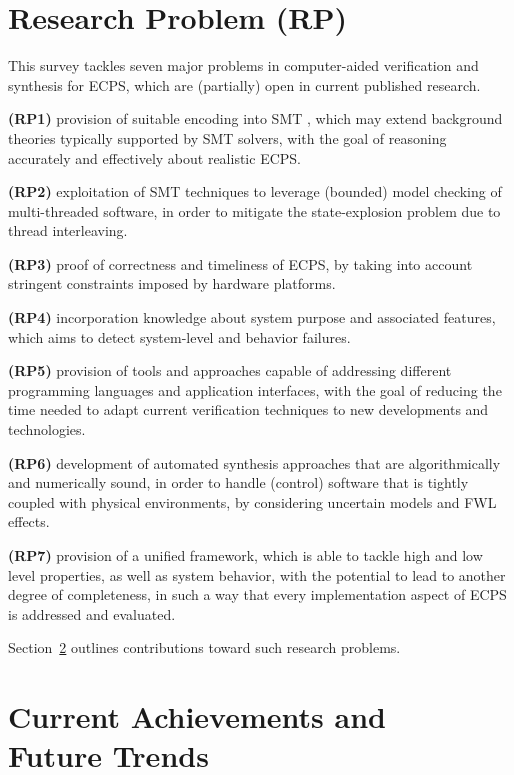 \documentclass[format=acmsmall, review=false, screen=true]{acmart}
\begin{document}
\section{Research Problem (RP)}
\label{Research-Problem}

This survey tackles seven major problems in computer-aided verification and synthesis for ECPS, which are (partially) open in current published research.

\textbf{(RP1)} provision of suitable encoding into SMT \cite{BarrettSST09}, which may extend background theories typically supported by SMT solvers, with the goal of reasoning accurately and effectively about realistic ECPS.

\textbf{(RP2)} exploitation of SMT techniques to leverage (bounded) model checking of multi-threaded software, in order to mitigate the state-explosion problem due to thread interleaving.
	
\textbf{(RP3)} proof of correctness and timeliness of ECPS, by taking into account stringent constraints imposed by hardware platforms.
	
\textbf{(RP4)} incorporation knowledge about system purpose and associated features, which aims to detect system-level and behavior failures.

\textbf{(RP5)} provision of tools and approaches capable of addressing different programming languages and application interfaces, with the goal of reducing the time needed to adapt current verification techniques to new developments and technologies.

\textbf{(RP6)} development of automated synthesis approaches that are algorithmically and numerically sound, in order to handle (control) software that is tightly coupled with physical environments, by considering uncertain models and FWL effects.

\textbf{(RP7)} provision of a unified framework, which is able to tackle high and low level properties, as well as system behavior, with the potential to lead to another degree of completeness, in such a way that every implementation aspect of ECPS is addressed and evaluated.

Section~\ref{achievements} outlines contributions toward such research problems.

\section{Current Achievements and \\ Future Trends}
\label{achievements}
\end{document}
